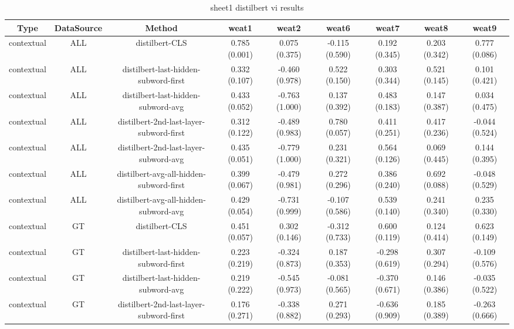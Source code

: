 \begin{sidewaystable}[htb]
    \centering
    \caption{sheet1 distilbert vi results}
    \label{appendix_tab:sheet1_distilbert_vi_results}
    \small
    \begin{tabular}{@{}ccccccccc@{}}
        \toprule
        Type & DataSource & Method & weat1 & weat2 & weat6 & weat7 & weat8 & weat9 \\
        \midrule
        contextual & ALL & distilbert-CLS & 0.785 (0.001) & 0.075 (0.375) & -0.115 (0.590) & 0.192 (0.345) & 0.203 (0.342) & 0.777 (0.086) \\
        contextual & ALL & distilbert-last-hidden-subword-first & 0.332 (0.107) & -0.460 (0.978) & 0.522 (0.150) & 0.303 (0.344) & 0.521 (0.145) & 0.101 (0.421) \\
        contextual & ALL & distilbert-last-hidden-subword-avg & 0.433 (0.052) & -0.763 (1.000) & 0.137 (0.392) & 0.483 (0.183) & 0.147 (0.387) & 0.034 (0.475) \\
        contextual & ALL & distilbert-2nd-last-layer-subword-first & 0.312 (0.122) & -0.489 (0.983) & 0.780 (0.057) & 0.411 (0.251) & 0.417 (0.236) & -0.044 (0.524) \\
        contextual & ALL & distilbert-2nd-last-layer-subword-avg & 0.435 (0.051) & -0.779 (1.000) & 0.231 (0.321) & 0.564 (0.126) & 0.069 (0.445) & 0.144 (0.395) \\
        contextual & ALL & distilbert-avg-all-hidden-subword-first & 0.399 (0.067) & -0.479 (0.981) & 0.272 (0.296) & 0.386 (0.240) & 0.692 (0.088) & -0.048 (0.529) \\
        contextual & ALL & distilbert-avg-all-hidden-subword-avg & 0.429 (0.054) & -0.731 (0.999) & -0.107 (0.586) & 0.539 (0.140) & 0.241 (0.340) & 0.235 (0.330) \\
        contextual & GT & distilbert-CLS & 0.451 (0.057) & 0.302 (0.146) & -0.312 (0.733) & 0.600 (0.119) & 0.124 (0.414) & 0.623 (0.149) \\
        contextual & GT & distilbert-last-hidden-subword-first & 0.223 (0.219) & -0.324 (0.873) & 0.187 (0.353) & -0.298 (0.619) & 0.307 (0.294) & -0.109 (0.576) \\
        contextual & GT & distilbert-last-hidden-subword-avg & 0.219 (0.222) & -0.545 (0.973) & -0.081 (0.565) & -0.370 (0.671) & 0.146 (0.386) & -0.035 (0.522) \\
        contextual & GT & distilbert-2nd-last-layer-subword-first & 0.176 (0.271) & -0.338 (0.882) & 0.271 (0.293) & -0.636 (0.909) & 0.185 (0.389) & -0.263 (0.666) \\

\end{tabular}
\end{sidewaystable}
